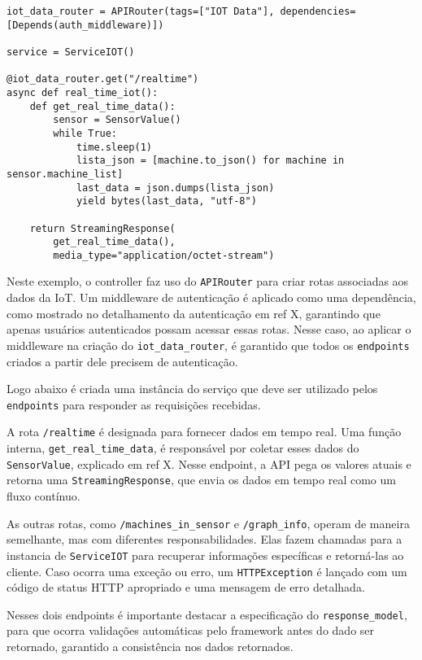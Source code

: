 \begin{verbatim}
iot_data_router = APIRouter(tags=["IOT Data"], dependencies=[Depends(auth_middleware)])

service = ServiceIOT()

@iot_data_router.get("/realtime")
async def real_time_iot(): 
    def get_real_time_data():
        sensor = SensorValue()
        while True:
            time.sleep(1)
            lista_json = [machine.to_json() for machine in sensor.machine_list]
            last_data = json.dumps(lista_json)
            yield bytes(last_data, "utf-8")

    return StreamingResponse(
        get_real_time_data(),
        media_type="application/octet-stream")
\end{verbatim}

Neste exemplo, o controller faz uso do \texttt{APIRouter} para criar rotas associadas aos dados da IoT. Um middleware de autenticação é aplicado como uma dependência, como mostrado no detalhamento da autenticação em ref X, garantindo que apenas usuários autenticados possam acessar essas rotas. Nesse caso, ao aplicar o middleware na criação do \texttt{iot\_data\_router}, é garantido que todos os \texttt{endpoints} criados a partir dele precisem de autenticação.

Logo abaixo é criada uma instância do serviço que deve ser utilizado pelos \texttt{endpoints} para responder as requisições recebidas.

A rota \texttt{/realtime} é designada para fornecer dados em tempo real. Uma função interna, \texttt{get\_real\_time\_data}, é 
responsável por coletar esses dados do \texttt{SensorValue}, explicado em ref X. Nesse endpoint, a API pega os valores atuais e retorna uma \texttt{StreamingResponse}, que envia os dados em tempo real como um fluxo contínuo.

As outras rotas, como \texttt{/machines\_in\_sensor} e \texttt{/graph\_info}, operam de maneira semelhante, mas com diferentes responsabilidades. Elas fazem chamadas para a instancia de \texttt{ServiceIOT} para recuperar informações específicas e retorná-las ao cliente. Caso ocorra uma exceção ou erro, um \texttt{HTTPException} é lançado com um código de status HTTP apropriado e uma mensagem de erro detalhada.

Nesses dois endpoints é importante destacar a especificação do \texttt{response\_model}, para que ocorra validações automáticas pelo framework antes do dado ser retornado, garantido a consistência nos dados retornados.

